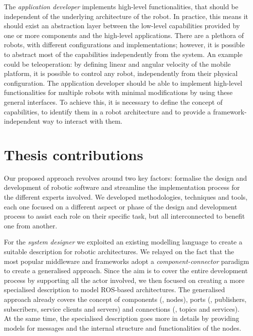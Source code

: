 The \textit{application developer} implements high-level functionalities, that should be independent of the underlying architecture of the robot. In practice, this means it should exist an abstraction layer between the low-level capabilities provided by one or more components and the high-level applications. There are a plethora of robots, with different configurations and implementations; however, it is possible to abstract most of the capabilities independently from the system. An example could be teleoperation: by defining linear and angular velocity of the mobile platform, it is possible to control any robot, independently from their physical configuration. The application developer should be able to implement high-level functionalities for multiple robots with minimal modifications by using these general interfaces. To achieve this, it is necessary to define the concept of capabilities, to identify them in a robot architecture and to provide a framework-independent way to interact with them.

\section{Thesis contributions}
Our proposed approach revolves around two key factors: formalise the design and development of robotic software and streamline the implementation process for the different experts involved. We developed methodologies, techniques and tools, each one focused on a different aspect or phase of the design and development process to assist each role on their specific task, but all interconnected to benefit one from another.

For the \textit{system designer} we exploited an existing modelling language to create a suitable description for robotic architectures. We relayed on the fact that the most popular middleware and frameworks adopt a \textit{component-connector} paradigm to create a generalised approach. Since the aim is to cover the entire development process by supporting all the actor involved, we then focused on creating a more specialised description to model ROS-based architectures. The generalised approach already covers the concept of components (\ie, nodes), ports (\ie, publishers, subscribers, service clients and servers) and connections (\ie, topics and services). At the same time, the specialised description goes more in details by providing models for messages and the internal structure and functionalities of the nodes.

